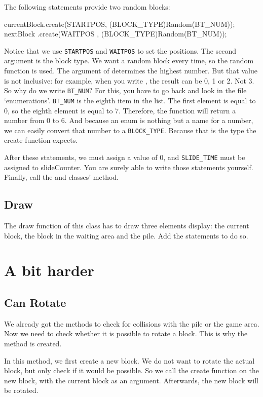 The following statements provide two random blocks:

\begin{code}
currentBlock.create(STARTPOS, (BLOCK_TYPE)Random(BT_NUM));
nextBlock   .create(WAITPOS , (BLOCK_TYPE)Random(BT_NUM));
\end{code}

Notice that we use \verb|STARTPOS| and \verb|WAITPOS| to set the positions. The second argument is the block type. We want a random block every time, so the random function is used. The argument of  determines the highest number. But that value is not inclusive: for example, when you write , the result can be 0, 1 or 2. Not 3. So why do we write \verb|BT_NUM|? For this, you have to go back and look in the file `enumerations'. \verb|BT_NUM| is the eighth item in the list. The first element is equal to 0, so the eighth element is equal to 7. Therefore, the  function will return a number from 0 to 6. And because an enum is nothing but a name for a number, we can easily convert that number to a \verb|BLOCK_TYPE|. Because that is the type the create function expects.

After these statements, we must assign  a value of 0, and \verb|SLIDE_TIME| must be assigned to slideCounter. You are surely able to write those statements yourself. Finally, call the  and  classes'  method.

\subsection{Draw}
The draw function of this class has to draw three elements display: the current block, the block in the waiting area and the pile. Add the statements to do so.

\section{A bit harder}

\subsection{Can Rotate}
We already got the methods to check for collisions with the pile or the game area. Now we need to check whether it is possible to rotate a block. This is why the method  is created.

In this method, we first create a new block. We do not want to rotate the actual block, but only check if it would be possible. So we call the create function on the new block, with the current block as an argument. Afterwards, the new block will be rotated.

